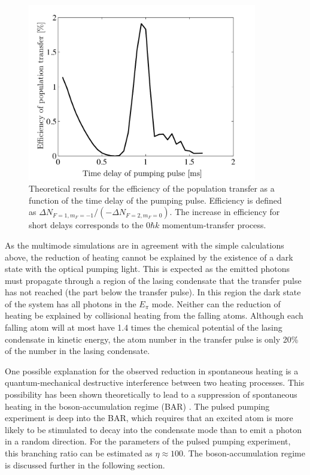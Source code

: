 \begin{figure}
    \centering
    \includegraphics[width=10cm]{PulsedPumpingTheoryTransferEfficiency}
    \caption{Theoretical results for the efficiency of the population transfer as a function of the time delay of the pumping pulse.  Efficiency is defined as $\Delta N_{F=1, m_F=-1} / (-\Delta N_{F=2, m_F=0})$.  The increase in efficiency for short delays corresponds to the $0 \hbar k$ momentum-transfer process.}
    \label{OpticalPumping:PulsedPumpingTheoryTransferEfficiency}
\end{figure}

As the multimode simulations are in agreement with the simple calculations above, the reduction of heating cannot be explained by the existence of a dark state with the optical pumping light.  This is expected as the emitted photons must propagate through a region of the lasing condensate that the transfer pulse has not reached (the part below the transfer pulse).  In this region the dark state of the system has all photons in the $E_\pi$ mode.  Neither can the reduction of heating be explained by collisional heating from the falling atoms.  Although each falling atom will at most have 1.4 times the chemical potential of the lasing condensate in kinetic energy, the atom number in the transfer pulse is only 20\% of the number in the lasing condensate.  

One possible explanation for the observed reduction in spontaneous heating is a quantum-mechanical destructive interference between two heating processes.  This possibility has been shown theoretically to lead to a suppression of spontaneous heating in the boson-accumulation regime (BAR) \citep{Cirac:1996rr,Floegel:2001}.  The pulsed pumping experiment is deep into the BAR, which requires that an excited atom is more likely to be stimulated to decay into the condensate mode than to emit a photon in a random direction.  For the parameters of the pulsed pumping experiment, this branching ratio can be estimated as $\eta \approx 100$.  The boson-accumulation regime is discussed further in the following section.

